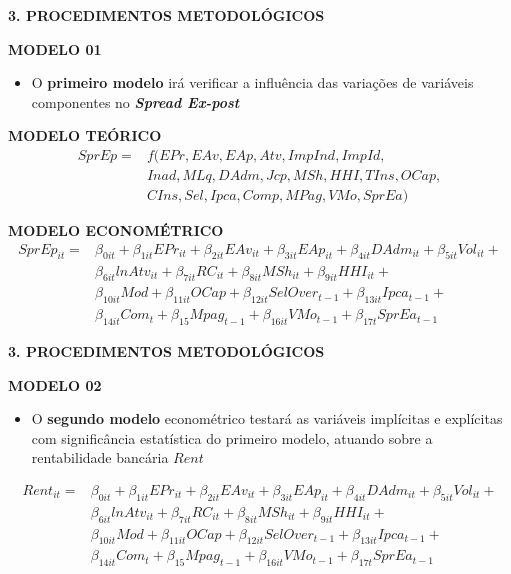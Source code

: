 \documentclass[ignorenonframetext,aspectratio=169,ignorenonframetext]{beamer}
\providecommand{\tightlist}{%
  \setlength{\itemsep}{0pt}\setlength{\parskip}{0pt}}
\begin{document}
\begin{frame}{\textbf{3. PROCEDIMENTOS METODOLÓGICOS}}
\protect\hypertarget{procedimentos-metodoluxf3gicos-6}{}

\textbf{MODELO 01}

\begin{itemize}
\tightlist
\item
  O \textbf{primeiro modelo} irá verificar a influência das variações de
  variáveis componentes no \textbf{\emph{\emph{Spread Ex-post}}}
\end{itemize}

\textbf{MODELO TEÓRICO} \[\begin{aligned}
SprEp = &f(EPr, EAv, EAp, Atv, ImpInd, ImpId, \\ 
& Inad, MLq, DAdm, Jcp, MSh, HHI, TIns, OCap, \\ 
& CIns, Sel, Ipca, Comp, MPag, VMo, SprEa)
\end{aligned}\]

\textbf{MODELO ECONOMÉTRICO} \[\begin{aligned}
SprEp_{it} = & \beta_{0it} + \beta_{1it}EPr_{it} + \beta_{2it}EAv_{it} + \beta_{3it}EAp_{it} + \beta_{4it}DAdm_{it} + \beta_{5it}Vol_{it} + \\
& \beta_{6it}lnAtv_{it} + \beta_{7it}RC_{it} + \beta_{8it}MSh_{it} + \beta_{9it}HHI_{it} + \\ 
& \beta_{10it}Mod + \beta_{11it}OCap + \beta_{12it}SelOver_{t-1} + \beta_{13it}Ipca_{t-1} + \\
& \beta_{14it}Com_{t} + \beta_{15}Mpag_{t-1} + \beta_{16it}VMo_{t-1} +  \beta_{17t}SprEa_{t-1}
\end{aligned}\]

\end{frame}

\begin{frame}{\textbf{3. PROCEDIMENTOS METODOLÓGICOS}}
\protect\hypertarget{procedimentos-metodoluxf3gicos-7}{}

\textbf{MODELO 02}

\begin{itemize}
\tightlist
\item
  O \textbf{segundo modelo} econométrico testará as variáveis implícitas
  e explícitas com significância estatística do primeiro modelo, atuando
  sobre a rentabilidade bancária \(Rent\)
\end{itemize}

\[\begin{aligned}
Rent_{it} = & \beta_{0it} + \beta_{1it}EPr_{it} + \beta_{2it}EAv_{it} + \beta_{3it}EAp_{it} + \beta_{4it}DAdm_{it} + \beta_{5it}Vol_{it} + \\
& \beta_{6it}lnAtv_{it} + \beta_{7it}RC_{it} + \beta_{8it}MSh_{it} + \beta_{9it}HHI_{it} + \\ 
& \beta_{10it}Mod + \beta_{11it}OCap + \beta_{12it}SelOver_{t-1} + \beta_{13it}Ipca_{t-1} + \\
& \beta_{14it}Com_{t} + \beta_{15}Mpag_{t-1} + \beta_{16it}VMo_{t-1} +  \beta_{17t}SprEa_{t-1}
\end{aligned}\]

\end{frame}
\end{document}
